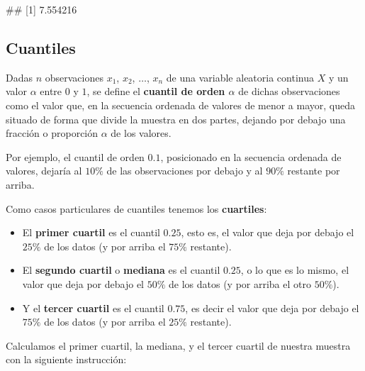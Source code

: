 \documentclass[
  title=normal,
  notoc,
  nobib,
  degree=mecinf]{mnye}
\newenvironment{Shaded}{\begin{snugshade}}{\end{snugshade}}
\newcommand{\FunctionTok}[1]{\textcolor[rgb]{0.00,0.00,0.00}{#1}}
\newcommand{\NormalTok}[1]{#1}
\newcommand{\SpecialCharTok}[1]{\textcolor[rgb]{0.00,0.00,0.00}{#1}}
\begin{document}
\begin{Shaded}
\end{Shaded}

\begin{Shaded}
\begin{Highlighting}[]
\NormalTok{\#\# [1] 7.554216}
\end{Highlighting}
\end{Shaded}

\hypertarget{quantiles}{%
\subsection{Cuantiles}\label{quantiles}}

Dadas \(n\) observaciones \(x_1\), \(x_2\), \(\dots\), \(x_n\) de una variable aleatoria continua \(X\) y un valor \(\alpha\) entre \(0\) y \(1\), se define el \textbf{cuantil de orden \(\alpha\)} de dichas observaciones como el valor que, en la secuencia ordenada de valores de menor a mayor, queda situado de forma que divide la muestra en dos partes, dejando por debajo una fracción o proporción \(\alpha\) de los valores.

Por ejemplo, el cuantil de orden \(0.1\), posicionado en la secuencia ordenada de valores, dejaría al \(10\%\) de las observaciones por debajo y al \(90\%\) restante por arriba.

Como casos particulares de cuantiles tenemos los \textbf{cuartiles}:

\begin{itemize}
\item
  El \textbf{primer cuartil} es el cuantil \(0.25\), esto es, el valor que deja por debajo el \(25\%\) de los datos (y por arriba el \(75\%\) restante).
\item
  El \textbf{segundo cuartil} o \textbf{mediana} es el cuantil \(0.25\), o lo que es lo mismo, el valor que deja por debajo el \(50\%\) de los datos (y por arriba el otro \(50\%\)).
\item
  Y el \textbf{tercer cuartil} es el cuantil \(0.75\), es decir el valor que deja por debajo el \(75\%\) de los datos (y por arriba el \(25\%\) restante).
\end{itemize}

Calculamos el primer cuartil, la mediana, y el tercer cuartil de nuestra muestra con la siguiente instrucción:
\end{document}
